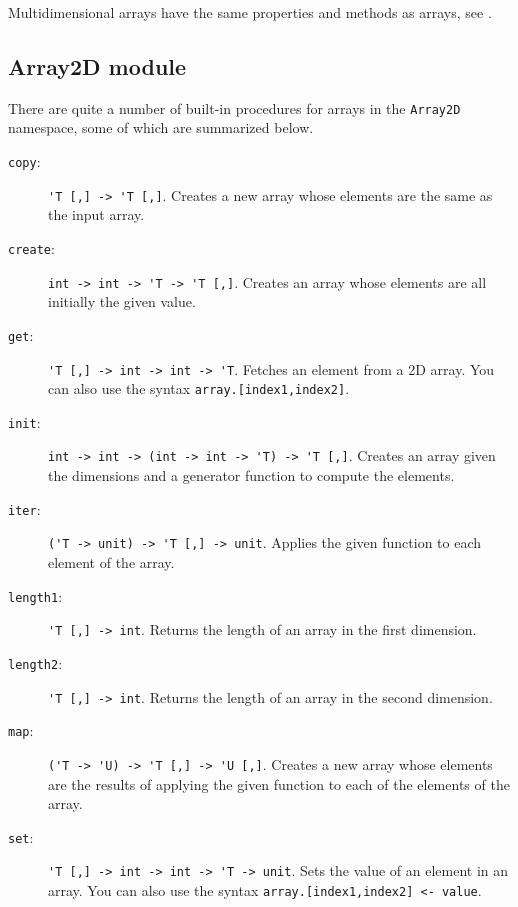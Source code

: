 Multidimensional arrays have the same properties and methods as arrays, see .

\subsection{Array2D module}
There are quite a number of built-in procedures for arrays in the \lstinline{Array2D} namespace, some of which are summarized below.
\begin{description}
\item[\texttt{copy}:] \lstinline{'T [,] -> 'T [,]}. Creates a new array whose elements are the same as the input array.
\item[\texttt{create}:] \lstinline{int -> int -> 'T -> 'T [,]}. Creates an array whose elements are all initially the given value.
\item[\texttt{get}:] \lstinline{'T [,] -> int -> int -> 'T}. Fetches an element from a 2D array. You can also use the syntax \lstinline{array.[index1,index2]}.
\item[\texttt{init}:] \lstinline{int -> int -> (int -> int -> 'T) -> 'T [,]}. Creates an array given the dimensions and a generator function to compute the elements.
\item[\texttt{iter}:] \lstinline{('T -> unit) -> 'T [,] -> unit}. Applies the given function to each element of the array.
\item[\texttt{length1}:] \lstinline{'T [,] -> int}. Returns the length of an array in the first dimension.
\item[\texttt{length2}:] \lstinline{'T [,] -> int}. Returns the length of an array in the second dimension.
\item[\texttt{map}:] \lstinline{('T -> 'U) -> 'T [,] -> 'U [,]}. Creates a new array whose elements are the results of applying the given function to each of the elements of the array.
\item[\texttt{set}:] \lstinline{'T [,] -> int -> int -> 'T -> unit}. Sets the value of an element in an array. You can also use the syntax \lstinline{array.[index1,index2] <- value}.
\end{description}


